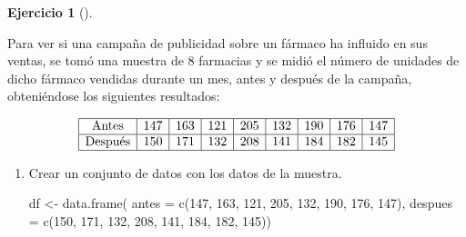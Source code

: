 \documentclass[
  a4paper,
]{scrreport}
\newenvironment{Shaded}{\begin{snugshade}}{\end{snugshade}}
\newcommand{\AttributeTok}[1]{\textcolor[rgb]{0.40,0.45,0.13}{#1}}
\newcommand{\DecValTok}[1]{\textcolor[rgb]{0.68,0.00,0.00}{#1}}
\newcommand{\FunctionTok}[1]{\textcolor[rgb]{0.28,0.35,0.67}{#1}}
\newcommand{\NormalTok}[1]{\textcolor[rgb]{0.00,0.23,0.31}{#1}}
\newcommand{\OtherTok}[1]{\textcolor[rgb]{0.00,0.23,0.31}{#1}}
\theoremstyle{definition}
\newtheorem{exercise}{Ejercicio}[chapter]
\theoremstyle{remark}
\begin{document}
\begin{exercise}[]\protect\hypertarget{exr-intervalo-diferencia-medias-datos-pareados-campaña-publicidad}{}\label{exr-intervalo-diferencia-medias-datos-pareados-campaña-publicidad}

Para ver si una campaña de publicidad sobre un fármaco ha influido en
sus ventas, se tomó una muestra de 8 farmacias y se midió el número de
unidades de dicho fármaco vendidas durante un mes, antes y después de la
campaña, obteniéndose los siguientes resultados:

\[
\begin{array}{|c|c|c|c|c|c|c|c|c|}
\hline 
\mbox{Antes} & 147 & 163 & 121 & 205 & 132 & 190 & 176 & 147 \\
\hline 
\mbox{Después} & 150 & 171 & 132 & 208 & 141 & 184 & 182 & 145\\ 
\hline
\end{array}
\]

\begin{enumerate}
\def\labelenumi{\alph{enumi}.}
\item
  Crear un conjunto de datos con los datos de la muestra.

  \begin{tcolorbox}[enhanced jigsaw, breakable, toptitle=1mm, colbacktitle=quarto-callout-tip-color!10!white, rightrule=.15mm, opacityback=0, opacitybacktitle=0.6, titlerule=0mm, coltitle=black, colframe=quarto-callout-tip-color-frame, colback=white, bottomtitle=1mm, leftrule=.75mm, toprule=.15mm, title=\textcolor{quarto-callout-tip-color}{\faLightbulb}\hspace{0.5em}{Solución}, arc=.35mm, bottomrule=.15mm, left=2mm]

\begin{Shaded}
\begin{Highlighting}[]
\NormalTok{df }\OtherTok{\textless{}{-}} \FunctionTok{data.frame}\NormalTok{(}
    \AttributeTok{antes =} \FunctionTok{c}\NormalTok{(}\DecValTok{147}\NormalTok{, }\DecValTok{163}\NormalTok{, }\DecValTok{121}\NormalTok{, }\DecValTok{205}\NormalTok{, }\DecValTok{132}\NormalTok{, }\DecValTok{190}\NormalTok{, }\DecValTok{176}\NormalTok{, }\DecValTok{147}\NormalTok{),}
    \AttributeTok{despues =} \FunctionTok{c}\NormalTok{(}\DecValTok{150}\NormalTok{, }\DecValTok{171}\NormalTok{, }\DecValTok{132}\NormalTok{, }\DecValTok{208}\NormalTok{, }\DecValTok{141}\NormalTok{, }\DecValTok{184}\NormalTok{, }\DecValTok{182}\NormalTok{, }\DecValTok{145}\NormalTok{))}
\end{Highlighting}
\end{Shaded}


\end{tcolorbox}
\end{enumerate}
\end{exercise}
\end{document}
